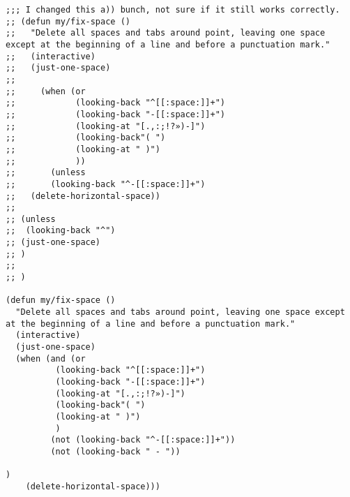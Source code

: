 \documentclass[11pt]{article}
\begin{document}
\label{sec:orgd6601fa}
\begin{verbatim}
;;; I changed this a)) bunch, not sure if it still works correctly.
;; (defun my/fix-space ()
;;   "Delete all spaces and tabs around point, leaving one space except at the beginning of a line and before a punctuation mark."
;;   (interactive)
;;   (just-one-space)
;;
;;     (when (or
;;            (looking-back "^[[:space:]]+")
;;            (looking-back "-[[:space:]]+")
;;            (looking-at "[.,:;!?»)-]")
;;            (looking-back"( ")
;;            (looking-at " )")
;;            ))
;;       (unless
;;       (looking-back "^-[[:space:]]+")
;;   (delete-horizontal-space))
;;
;; (unless
;;  (looking-back "^")
;; (just-one-space)
;; )
;;
;; )

(defun my/fix-space ()
  "Delete all spaces and tabs around point, leaving one space except at the beginning of a line and before a punctuation mark."
  (interactive)
  (just-one-space)
  (when (and (or
	      (looking-back "^[[:space:]]+")
	      (looking-back "-[[:space:]]+")
	      (looking-at "[.,:;!?»)-]")
	      (looking-back"( ")
	      (looking-at " )")
	      )
	     (not (looking-back "^-[[:space:]]+"))
	     (not (looking-back " - "))

)
    (delete-horizontal-space)))
\end{verbatim}
\end{document}

